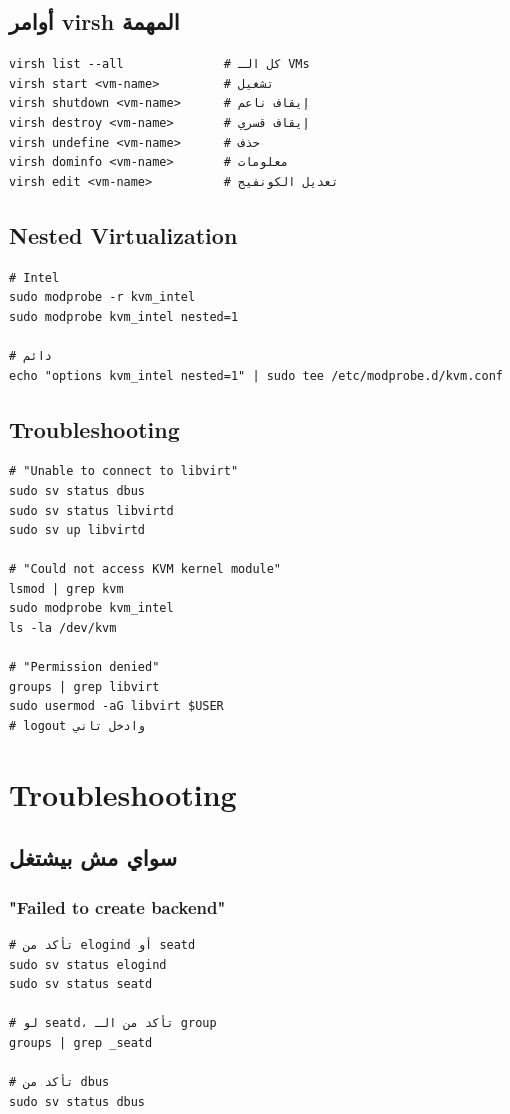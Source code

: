 \documentclass[12pt, a4paper]{report}
\begin{document}
\section{أوامر virsh المهمة}
\begin{lstlisting}
virsh list --all              # كل الـ VMs
virsh start <vm-name>         # تشغيل
virsh shutdown <vm-name>      # إيقاف ناعم
virsh destroy <vm-name>       # إيقاف قسري
virsh undefine <vm-name>      # حذف
virsh dominfo <vm-name>       # معلومات
virsh edit <vm-name>          # تعديل الكونفيج
\end{lstlisting}

\section{Nested Virtualization}
\begin{lstlisting}
# Intel
sudo modprobe -r kvm_intel
sudo modprobe kvm_intel nested=1

# دائم
echo "options kvm_intel nested=1" | sudo tee /etc/modprobe.d/kvm.conf
\end{lstlisting}

\section{Troubleshooting}
\begin{lstlisting}
# "Unable to connect to libvirt"
sudo sv status dbus
sudo sv status libvirtd
sudo sv up libvirtd

# "Could not access KVM kernel module"
lsmod | grep kvm
sudo modprobe kvm_intel
ls -la /dev/kvm

# "Permission denied"
groups | grep libvirt
sudo usermod -aG libvirt $USER
# logout وادخل تاني
\end{lstlisting}

\chapter{Troubleshooting}

\section{سواي مش بيشتغل}

\subsection{"Failed to create backend"}
\begin{lstlisting}
# تأكد من elogind أو seatd
sudo sv status elogind
sudo sv status seatd

# لو seatd، تأكد من الـ group
groups | grep _seatd

# تأكد من dbus
sudo sv status dbus
\end{lstlisting}
\end{document}
